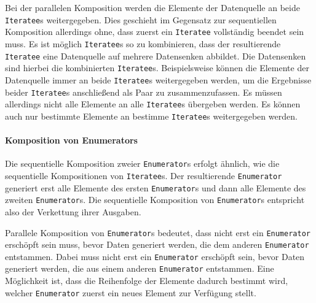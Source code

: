 \documentclass[draft=false
              ,paper=a4
              ,twoside=false
              ,fontsize=11pt
              ,headsepline
              ,BCOR10mm
              ,DIV11
              ]{scrbook}
\begin{document}
Bei der parallelen Komposition werden die Elemente der Datenquelle an beide \lstinline|Iteratee|s weitergegeben.
Dies geschieht im Gegensatz zur sequentiellen Komposition allerdings ohne, dass zuerst ein \lstinline|Iteratee| vollständig beendet sein muss.
Es ist möglich \lstinline|Iteratee|s so zu kombinieren, dass der resultierende \lstinline|Iteratee| eine Datenquelle auf mehrere Datensenken abbildet.
Die Datensenken sind hierbei die kombinierten \lstinline|Iteratee|s.
Beispielsweise können die Elemente der Datenquelle immer an beide \lstinline|Iteratee|s weitergegeben werden, um die Ergebnisse beider \lstinline|Iteratee|s anschließend als Paar zu zusammenzufassen.
Es müssen allerdings nicht alle Elemente an alle \lstinline|Iteratee|s übergeben werden.
Es können auch nur bestimmte Elemente an bestimme \lstinline|Iteratee|s weitergegeben werden. %


\paragraph{Komposition von Enumerators} %
\label{par:komposition_von_enumerators}\mbox{} %

Die sequentielle Komposition zweier \lstinline|Enumerator|s erfolgt ähnlich, wie die sequentielle Kompositionen von \lstinline|Iteratee|s.
Der resultierende \lstinline|Enumerator| generiert erst alle Elemente des ersten \lstinline|Enumerator|s und dann alle Elemente des zweiten \lstinline|Enumerator|s.
Die sequentielle Komposition von \lstinline|Enumerator|s entspricht also der Verkettung ihrer Ausgaben. %

Parallele Komposition von \lstinline|Enumerator|s bedeutet, dass nicht erst ein \lstinline|Enumerator| erschöpft sein muss, bevor Daten generiert werden, die dem anderen \lstinline|Enumerator| entstammen.
Dabei muss nicht erst ein \lstinline|Enumerator| erschöpft sein, bevor Daten generiert werden, die aus einem anderen \lstinline|Enumerator| entstammen.
Eine Möglichkeit ist, dass die Reihenfolge der Elemente dadurch bestimmt wird, welcher \lstinline|Enumerator| zuerst ein neues Element zur Verfügung stellt. %




\end{document}

